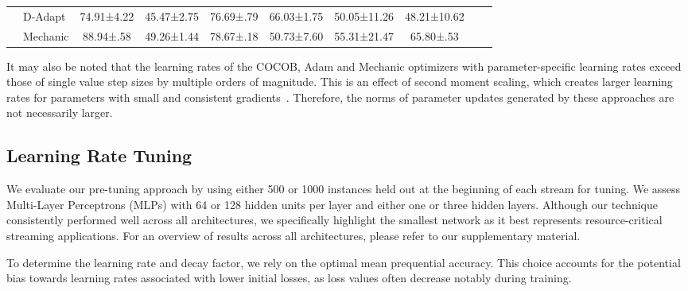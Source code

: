 \documentclass[runningheads]{llncs}
\begin{document}
\begin{table}[ht]
\begin{tabular}{llcccccccc}
		                                                   & D-Adapt                    \cite{defazioLearningRateFreeLearningDAdaptation2023a} & 74.91±4.22          & 45.47±2.75           & 76.69±.79             & 66.03±1.75           & 50.05±11.26         & 48.21±10.62         \\
		                                                   & Mechanic \cite{cutkoskyMechanicLearningRate2023}                                  & 88.94±.58           & 49.26±1.44           & 78.67±.18             & 50.73±7.60           & 55.31±21.47         & 65.80±.53           \\
		\bottomrule
	\end{tabular}
	\label{tab:results_adaptive_optims}
\end{table}

It may also be noted that the learning rates of the COCOB, Adam and Mechanic optimizers with parameter-specific learning rates exceed those of single value step sizes by multiple orders of magnitude.
This is an effect of second moment scaling, which creates larger learning rates for parameters with small and consistent gradients~\cite{cutkoskyMechanicLearningRate2023}.
Therefore, the norms of parameter updates generated by these approaches are not necessarily larger.


\subsection{Learning Rate Tuning}

We evaluate our pre-tuning approach by using either 500 or 1000 instances held out at the beginning of each stream for tuning. We assess Multi-Layer Perceptrons (MLPs) with 64 or 128 hidden units per layer and either one or three hidden layers.
Although our technique consistently performed well across all architectures, we specifically highlight the smallest network as it best represents resource-critical streaming applications. For an overview of results across all architectures, please refer to our supplementary material.

To determine the learning rate and decay factor, we rely on the optimal mean prequential accuracy. This choice accounts for the potential bias towards learning rates associated with lower initial losses, as loss values often decrease notably during training.
\end{document}
